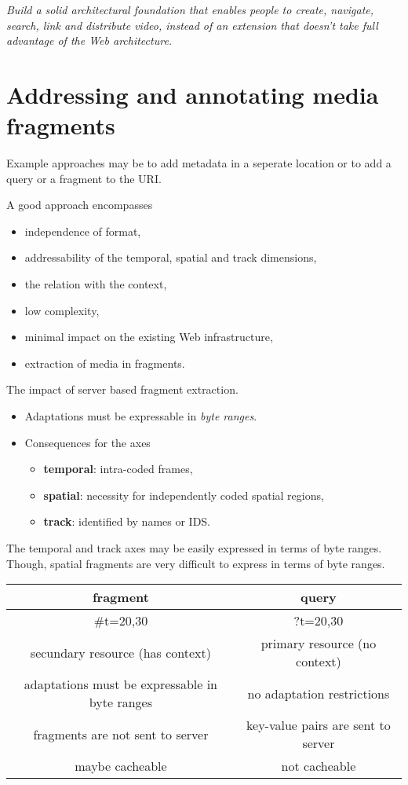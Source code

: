 \documentclass{report}
\begin{document}
\textit{
  Build a solid architectural foundation
  that enables people to create, navigate,
  search, link and distribute video,
  instead of an extension
  that doesn't take full advantage
  of the Web architecture.
}

\section{Addressing and annotating media fragments}

Example approaches may be
to add metadata in a seperate location
or to add a query or a fragment to the URI.

A good approach encompasses
\begin{itemize}
  \item independence of format,
  \item addressability of the temporal, spatial and track dimensions,
  \item the relation with the context,
  \item low complexity,
  \item minimal impact on the existing Web infrastructure,
  \item extraction of media in fragments.
\end{itemize}

The impact of server based fragment extraction.
\begin{itemize}
  \item Adaptations must be expressable in \emph{byte ranges}.
  \item Consequences for the axes
        \begin{itemize}
          \item \textbf{temporal}: intra-coded frames,
          \item \textbf{spatial}: necessity
                for independently coded spatial regions,
          \item \textbf{track}: identified by names or IDS.
        \end{itemize}
\end{itemize}

The temporal and track axes may be
easily expressed in terms of byte ranges.
Though, spatial fragments are very difficult
to express in terms of byte ranges.

\begin{tabular}{|c|c|}
  \hline
  fragment & query\\
  \hline
  \#t=20,30 & ?t=20,30\\
  \hline
  secundary resource (has context) & primary resource (no context)\\
  \hline
  adaptations must be expressable in byte ranges & no adaptation restrictions\\
  \hline
  fragments are not sent to server & key-value pairs are sent to server\\
  \hline
  maybe cacheable & not cacheable\\
  \hline
\end{tabular}
\end{document}
